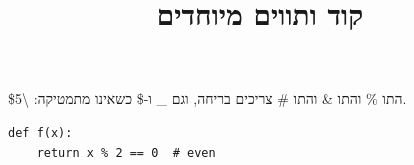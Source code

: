 \documentclass[11pt,a4paper]{article}
\title{קוד ותווים מיוחדים}
\date{}
\begin{document}
\maketitle

התו \% והתו \& והתו \# צריכים בריחה, וגם \_ ו-\$ כשאינו מתמטיקה: \textbackslash{}\$5.

\begin{otherlanguage}{english}
\begin{verbatim}
def f(x):
    return x % 2 == 0  # even
\end{verbatim}
\end{otherlanguage}
\end{document}
